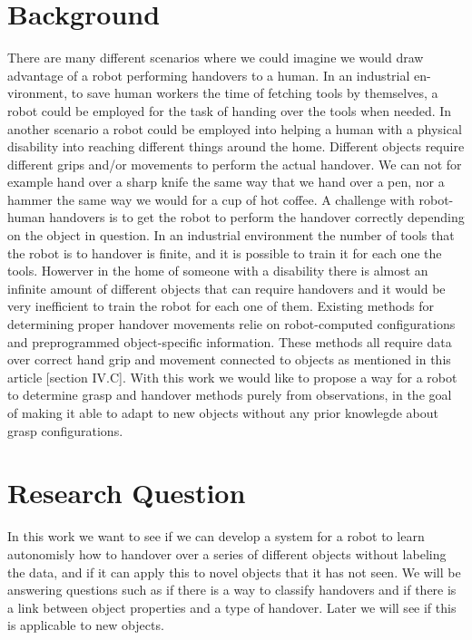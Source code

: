 \section{Background}

There are many different scenarios where we could imagine we would draw advantage of a robot performing handovers to a human. In an industrial en- vironment, to save human workers the time of fetching tools by themselves, a robot could be employed for the task of handing over the tools when needed. In another scenario a robot could be employed into helping a human with a physical disability into reaching different things around the home. Different objects require different grips and/or movements to perform the actual handover. We can not for example hand over a sharp knife the same way that we hand over a pen, nor a hammer the same way we would for a cup of hot coffee. A challenge with robot-human handovers is to get the robot to perform the handover correctly depending on the object in question. In an industrial environment the number of tools that the robot is to handover is finite, and it is possible to train it for each one the tools. Howerver in the home of someone with a disability there is almost an infinite amount of different objects that can require handovers and it would be very inefficient to train the robot for each one of them. Existing methods for determining proper handover movements relie on robot-computed configurations and preprogrammed object-specific information. These methods all require data over correct hand grip and movement connected to objects as mentioned in this article [section IV.C]. With this work we would like to propose a way for a robot to determine grasp and handover methods purely from observations, in the goal of making it able to adapt to new objects without any prior knowlegde about grasp configurations.

\section{Research Question}

In this work we want to see if we can develop a system for a robot to learn autonomisly how to handover over a series of different objects without labeling the data, and if it can apply this to novel objects that it has not seen. We will be answering questions such as if there is a way to classify handovers and if there is a link between object properties and a type of handover. Later we will see if this is applicable to new objects.
